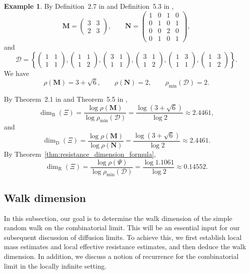 \documentclass{article}
\theoremstyle{plain}
\theoremstyle{definition}
\newtheorem{example}[theorem]{Example}
\newcommand{\dimbox}{\dim_\mathrm{B}}
\newcommand{\dimdeg}{\dim_\mathrm{D}}
\newcommand{\dimresis}{\dim_\mathrm{R}}
\begin{document}
\begin{example}
By Definition~2.7 in \cite{neroli2024fractal} and Definition~5.3 in \cite{li2024on},
\[
\mathbf M=
\begin{pmatrix}
3 & 3\\
2 & 3
\end{pmatrix},
\qquad
\mathbf N=
\begin{pmatrix}
1&0&1&0\\
0&1&0&1\\
0&0&2&0\\
0&1&0&1
\end{pmatrix},
\]
and
\[
\mathcal D=
\left\{
\begin{pmatrix}1&1\\ 1&1\end{pmatrix},
\begin{pmatrix}1&1\\ 1&2\end{pmatrix},
\begin{pmatrix}3&1\\ 1&1\end{pmatrix},
\begin{pmatrix}3&1\\ 1&2\end{pmatrix},
\begin{pmatrix}1&3\\ 1&1\end{pmatrix},
\begin{pmatrix}1&3\\ 1&2\end{pmatrix}
\right\}.
\]
We have
\[
\rho(\mathbf M)=3+\sqrt{6},
\qquad
\rho(\mathbf N)=2,
\qquad
\rho_{\min}(\mathcal D)=2.
\]

By Theorem~2.1 in \cite{neroli2024fractal} and Theorem~5.5 in \cite{li2024on},
\[
\dimbox(\Xi)
=
\frac{\log\rho(\mathbf M)}{\log\rho_{\min}(\mathcal D)}
=
\frac{\log(3+\sqrt{6})}{\log 2}
\approx 2.4461,
\]
and
\[
\dimdeg(\Xi)
=
\frac{\log\rho(\mathbf M)}{\log\rho(\mathbf N)}
=
\frac{\log(3+\sqrt{6})}{\log 2}
\approx 2.4461.
\]
By Theorem~\ref{thm:resistance_dimension_formula},
\[
\dimresis(\Xi)
=
\frac{\log \rho(\Psi)}{\log \rho_{\min}(\mathcal D)}
=
\frac{\log 1.1061}{\log 2}
\approx 0.14552.
\]
\end{example}

\subsection{Walk dimension}\label{subsec:walk_dimension}

In this subsection, our goal is to determine the walk dimension of the simple random walk on the combinatorial limit.
This will be an essential input for our subsequent discussion of diffusion limits.
To achieve this, we first establish local mass estimates and local effective resistance estimates, and then deduce the walk dimension.
In addition, we discuss a notion of recurrence for the combinatorial limit in the locally infinite setting.
\end{document}
